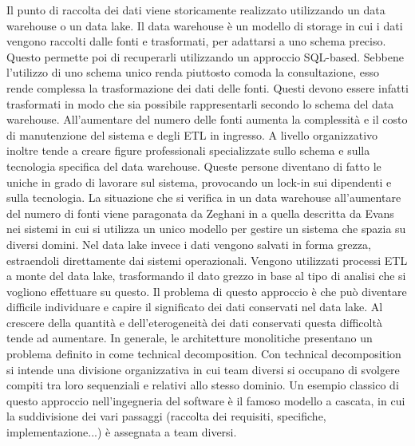 \documentclass[a4paper,12pt]{report}
\begin{document}
Il punto di raccolta dei dati viene storicamente realizzato utilizzando un data warehouse o un data lake. 
Il data warehouse è un modello di storage in cui i dati vengono raccolti dalle fonti e trasformati, per adattarsi a uno schema preciso. 
Questo permette poi di recuperarli utilizzando un approccio SQL-based. 
Sebbene l'utilizzo di uno schema unico renda piuttosto comoda la consultazione, esso rende complessa la trasformazione dei dati delle fonti.
Questi devono essere infatti trasformati in modo che sia possibile rappresentarli secondo lo schema del data warehouse.
All'aumentare del numero delle fonti aumenta la complessità e il costo di manutenzione del sistema e degli ETL in ingresso.
A livello organizzativo inoltre tende a creare figure professionali specializzate sullo schema e sulla tecnologia specifica del data warehouse. 
Queste persone diventano di fatto le uniche in grado di lavorare sul sistema, provocando un lock-in sui dipendenti e sulla tecnologia.
La situazione che si verifica in un data warehouse all'aumentare del numero di fonti viene paragonata da Zeghani in \cite{dehghani_data_2022} a quella descritta da Evans nei sistemi in cui si utilizza un unico modello per gestire un sistema che spazia su diversi domini.
Nel data lake invece i dati vengono salvati in forma grezza, estraendoli direttamente dai sistemi operazionali.
Vengono utilizzati processi ETL a monte del data lake, trasformando il dato grezzo in base al tipo di analisi che si vogliono effettuare su questo.
Il problema di questo approccio è che può diventare difficile individuare e capire il significato dei dati conservati nel data lake.
Al crescere della quantità e dell'eterogeneità dei dati conservati questa difficoltà tende ad aumentare.
In generale, le architetture monolitiche presentano un problema definito in \cite{perry_foundations_1992} come technical decomposition.
Con  technical decomposition si intende una divisione organizzativa in cui team diversi si occupano di svolgere compiti tra loro sequenziali e relativi allo stesso dominio.
Un esempio classico di questo approccio nell'ingegneria del software è il famoso modello a cascata, in cui la suddivisione dei vari passaggi (raccolta dei requisiti, specifiche, implementazione...) è assegnata a team diversi.
\end{document}
